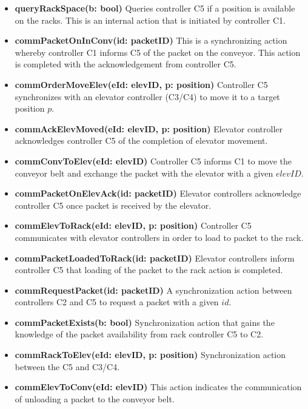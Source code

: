 \begin{itemize}
\item \textbf{queryRackSpace(b: bool)}
Queries controller C5 if a position is available on the racks. This is an internal action that is initiated by controller C1.

\item \textbf{commPacketOnInConv(id: packetID)}
This is a synchronizing action whereby controller C1 informs C5 of the packet on the conveyor. This action is completed with the acknowledgement from controller C5.

\item \textbf{commOrderMoveElev(eId: elevID, p: position)}
Controller C5 synchronizes with an elevator controller (C3/C4) to move it to a target position $p$.

\item \textbf{commAckElevMoved(eId: elevID, p: position)}
Elevator controller acknowledges controller C5 of the completion of elevator movement.

\item \textbf{commConvToElev(eId: elevID)}
Controller C5 informs C1 to move the conveyor belt and exchange the packet with the elevator with a given $elevID$.

\item \textbf{commPacketOnElevAck(id: packetID)}
Elevator controllers acknowledge controller C5 once packet is received by the elevator.

\item \textbf{commElevToRack(eId: elevID, p: position)}
Controller C5 communicates with elevator controllers in order to load to packet to the rack.

\item \textbf{commPacketLoadedToRack(id: packetID)}
Elevator controllers inform controller C5 that loading of the packet to the rack action is completed.

\item \textbf{commRequestPacket(id: packetID)}
A synchronization action between controllers C2 and C5 to request a packet with a given $id$.

\item \textbf{commPacketExists(b: bool)}
Synchronization action that gains the knowledge of the packet availability from rack controller C5 to C2.

\item \textbf{commRackToElev(eId: elevID, p: position)}
Synchronization action between the C5 and C3/C4.

\item \textbf{commElevToConv(eId: elevID)}
This action indicates the communication of unloading a packet to the conveyor belt.

\end{itemize}

